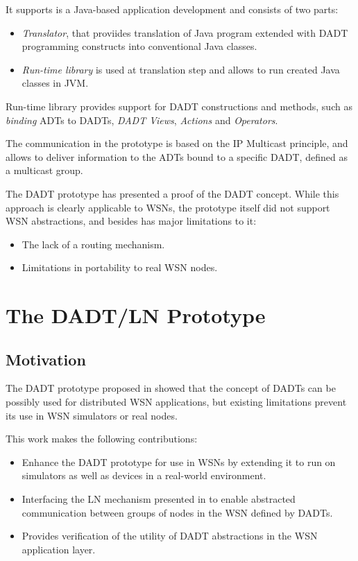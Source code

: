 It supports is a Java-based application development and consists of two parts:
\begin{itemize}
  \item \emph{Translator}, that proviides translation of Java program
  extended with DADT programming constructs into conventional Java classes.
  \item \emph{Run-time library} is used at translation step and allows to run
  created Java classes in  JVM.
\end{itemize}

Run-time library provides support for DADT constructions and methods, such as
\emph{binding} ADTs to DADTs, \emph{DADT Views}, \emph{Actions} and
\emph{Operators}. 

The communication in the prototype is based on the IP Multicast principle, and
allows to deliver information to the ADTs bound to a specific DADT, defined as
a multicast group.

The DADT prototype has presented a proof of the DADT concept. While this
approach is clearly applicable to WSNs, the prototype itself did not support WSN
abstractions, and besides has major limitations to it:

\begin{itemize}
  \item The lack of a routing mechanism.
  \item Limitations in portability to real WSN nodes.
\end{itemize}

\section{The DADT/LN Prototype}

\subsection{Motivation}

The DADT prototype proposed in \cite{migliavacca_DADT:2006} showed that the
concept of DADTs can be possibly used for distributed WSN
applications, but existing limitations prevent its use in WSN simulators or real nodes.

This work makes the following contributions:

\begin{itemize}
  \item Enhance the DADT prototype for use in WSNs by extending it to run
  on simulators as well as devices in a real-world environment.
  \item Interfacing the LN mechanism presented in \cite{mottola_LNAbstraction}
  to enable abstracted communication between groups of nodes in the WSN defined
  by DADTs.
  \item  Provides verification of the utility of DADT abstractions in the WSN
  application layer.
\end{itemize}

